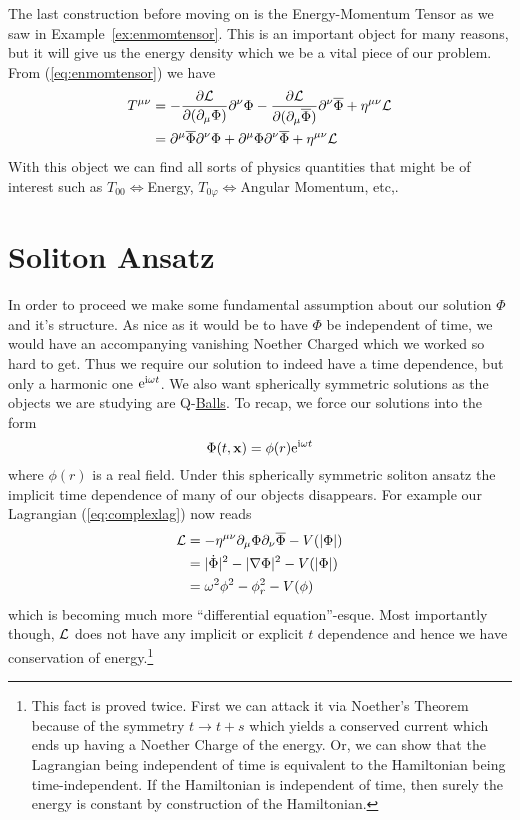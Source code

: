 The last construction before moving on is the Energy-Momentum Tensor as we saw
in Example~\ref{ex:enmomtensor}. This is an important object for many reasons,
but it will give us the energy density which we be a vital piece of our problem.
From (\ref{eq:enmomtensor}) we have
\begin{align}
    T^{\mu\nu} & = -\pdv{\mathcal{L}}{(\partial_\mu\Phi)}\partial^\nu\Phi - \pdv{\mathcal{L}}{(\partial_\mu\overline{\Phi})}\partial^\nu\overline{\Phi} + \eta^{\mu\nu}\mathcal{L} \\
               & = \partial^\mu\overline{\Phi}\partial^\nu\Phi + \partial^\mu\Phi\partial^\nu\overline{\Phi} + \eta^{\mu\nu}\mathcal{L} \label{eq:enmomlowered}
\end{align}
With this object we can find all sorts of physics quantities that might be of
interest such as \(T_{00}\!\iff\)Energy, \(T_{0\varphi}\!\iff\)Angular
Momentum, etc,.

\section{Soliton Ansatz}\label{sec:solitonans}
In order to proceed we make some fundamental assumption about our solution
\(\Phi\) and it's structure. As nice as it would be to have \(\Phi\) be
independent of time, we would have an accompanying vanishing Noether Charged
which we worked so hard to get. Thus we require our solution to indeed have a
time dependence, but only a harmonic one \(\mathrm{e}^{\mathrm{i}\omega t}\). We also want
spherically symmetric solutions as the objects we are studying are
Q-\underline{Balls}. To recap, we force our solutions into the form
\begin{equation}\label{eq:solitonansatz}
    \Phi(t, \mathbf{x}) = \phi(r)\mathrm{e}^{\mathrm{i}\omega t}
\end{equation}
where \(\phi(r)\) is a real field. Under this spherically symmetric soliton
ansatz the implicit time dependence of many of our objects disappears. For
example our Lagrangian (\ref{eq:complexlag}) now reads
\begin{align}
    \mathcal{L} & = -\eta^{\mu\nu}\partial_\mu\Phi\partial_\nu\overline{\Phi} - V(|\Phi|) \\
         & = |\dot{\Phi}|^2 - |\nabla\Phi|^2 - V(|\Phi|) \\
         & = \omega^2\phi^2 - \phi_r^2 - V(\phi)
\end{align}
which is becoming much more ``differential equation''-esque. Most importantly
though, \(\mathcal{L}\) does not have any implicit or explicit \(t\) dependence and
hence we have conservation of energy.\footnote{This fact is proved twice. First
we can attack it via Noether's Theorem because of the symmetry \(t\to t + s\)
which yields a conserved current which ends up having a Noether Charge of the
energy. Or, we can show that the Lagrangian being independent of time is
equivalent to the Hamiltonian being time-independent. If the Hamiltonian is
independent of time, then surely the energy is constant by construction of the
Hamiltonian.}

